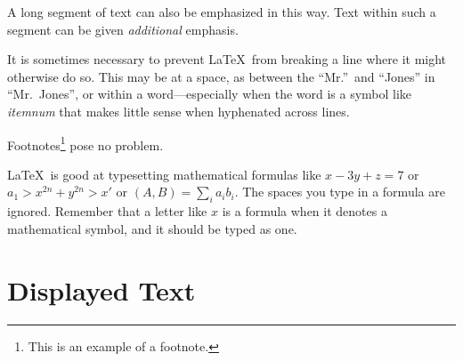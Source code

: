 \documentclass{article}      %
\newcommand{\ip}[2]{(#1, #2)}
\begin{document}
\begin{em}
   A long segment of text can also be emphasized
   in this way.  Text within such a segment can be
   given \emph{additional} emphasis.
\end{em}

It is sometimes necessary to prevent \LaTeX\ from
breaking a line where it might otherwise do so.
This may be at a space, as between the ``Mr.''\ and
``Jones'' in
       ``Mr.~Jones'',        %
or within a word---especially when the word is a
symbol like
       \mbox{\emph{itemnum}}
that makes little sense when hyphenated across
lines.

Footnotes\footnote{This is an example of a footnote.}
pose no problem.

\LaTeX\ is good at typesetting mathematical formulas
like
       \( x-3y + z = 7 \)
or
       \( a_{1} > x^{2n} + y^{2n} > x' \)
or
       \( \ip{A}{B} = \sum_{i} a_{i} b_{i} \).
The spaces you type in a formula are
ignored.  Remember that a letter like
       $x$                   %
is a formula when it denotes a mathematical
symbol, and it should be typed as one.

\section{Displayed Text}
\end{document}
